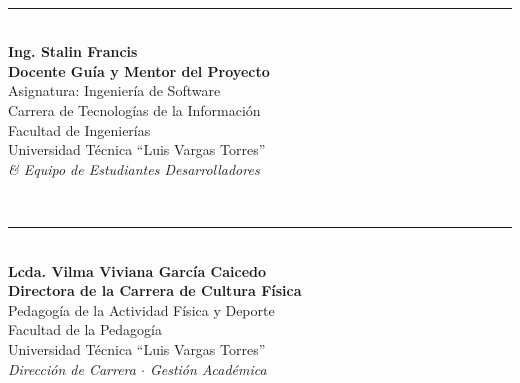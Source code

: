 \documentclass[11pt,a4paper]{article}
\begin{document}
\vspace{8mm}

\noindent
\begin{minipage}[t]{0.48\textwidth}
    \centering
    \textbf{\color{UtlvteNavy}{POR EL EQUIPO DE DESARROLLO}}\\[18mm]
    \rule{0.88\linewidth}{0.6pt}\\[2mm]
    \textbf{Ing. Stalin Francis}\\[0.5mm]
    {\small \textbf{Docente Guía y Mentor del Proyecto}}\\
    {\small Asignatura: Ingeniería de Software}\\
    {\small Carrera de Tecnologías de la Información}\\
    {\footnotesize Facultad de Ingenierías}\\
    {\footnotesize Universidad Técnica ``Luis Vargas Torres''}\\[1.5mm]
    {\scriptsize \textit{\& Equipo de Estudiantes Desarrolladores}}
\end{minipage}
\hfill
\begin{minipage}[t]{0.48\textwidth}
    \centering
    \textbf{\color{UtlvteNavy}{RECEPCIÓN Y VISTO BUENO}}\\[18mm]
    \rule{0.88\linewidth}{0.6pt}\\[2mm]
    \textbf{Lcda. Vilma Viviana García Caicedo}\\[0.5mm]
    {\small \textbf{Directora de la Carrera de Cultura Física}}\\
    {\small Pedagogía de la Actividad Física y Deporte}\\
    {\footnotesize Facultad de la Pedagogía}\\
    {\footnotesize Universidad Técnica ``Luis Vargas Torres''}\\[1.5mm]
    {\scriptsize \textit{Dirección de Carrera $\cdot$ Gestión Académica}}
\end{minipage}

\vspace{12mm}
\begin{center}
    \colorbox{CardBg}{\parbox{0.92\linewidth}{
        \centering \vspace{1.5mm}
        {\footnotesize {}}\\[0.5mm]
        {\scriptsize {}}
        \vspace{1.5mm}
    }}
\end{center}
\end{document}
